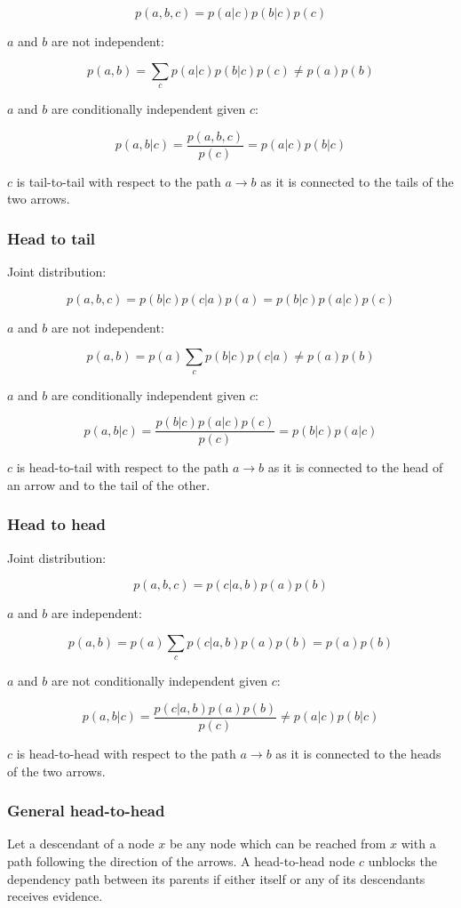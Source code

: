 		$$p(a,b,c) = p(a|c)p(b|c)p(c)$$

		$a$ and $b$ are not independent:

		$$p(a,b) = \sum\limits_cp(a|c)p(b|c)p(c) \neq p(a)p(b)$$

		$a$ and $b$ are conditionally independent given $c$:

		$$p(a,b|c) = \frac{p(a,b,c)}{p(c)} = p(a|c)p(b|c)$$

		$c$ is tail-to-tail with respect to the path $a\rightarrow b$ as it is connected to the tails of the two arrows.

		\subsubsection{Head to tail}
		Joint distribution:

		$$p(a,b,c) = p(b|c)p(c|a)p(a) = p(b|c)p(a|c)p(c)$$

		$a$ and $b$ are not independent:

		$$p(a,b) = p(a)\sum\limits_cp(b|c)p(c|a)\neq p(a)p(b)$$

		$a$ and $b$ are conditionally independent given $c$:

		$$p(a,b|c) = \frac{p(b|c)p(a|c)p(c)}{p(c)} = p(b|c)p(a|c)$$

		$c$ is head-to-tail with respect to the path $a\rightarrow b$ as it is connected to the head of an arrow and to the tail of the other.

		\subsubsection{Head to head}
		Joint distribution:

		$$p(a,b,c) = p(c|a,b)p(a)p(b)$$

		$a$ and $b$ are independent:

		$$p(a,b) = p(a)\sum\limits_cp(c|a,b)p(a)p(b)=p(a)p(b)$$

		$a$ and $b$ are not conditionally independent given $c$:

		$$p(a,b|c) = \frac{p(c|a,b)p(a)p(b)}{p(c)} \neq p(a|c)p(b|c)$$

		$c$ is head-to-head with respect to the path $a\rightarrow b$ as it is connected to the heads of the two arrows.

		\subsubsection{General head-to-head}
		Let a descendant of a node $x$ be any node which can be reached from $x$ with a path following the direction of the arrows.
		A head-to-head node $c$ unblocks the dependency path between its parents if either itself or any of its descendants receives evidence.

